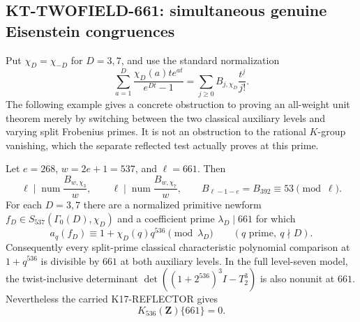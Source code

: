 \subsection{KT-TWOFIELD-661: simultaneous genuine Eisenstein congruences}
\label{sec:kt-twofield-661}

Put $\chi_D=\chi_{-D}$ for $D=3,7$, and use the standard
normalization
\[
 \sum_{a=1}^{D}\frac{\chi_D(a)t e^{at}}{e^{Dt}-1}
       =\sum_{j\geq0}B_{j,\chi_D}\frac{t^j}{j!}.
                                                               \tag{TF.1}
\]
The following example gives a concrete obstruction to proving
an all-weight unit theorem merely by switching between the
two classical auxiliary levels and varying split Frobenius
primes. It is not an obstruction to the rational $K$-group
vanishing, which the separate reflected test actually proves
at this prime.

\begin{proposition}[KT-TWOFIELD-661]
Let $e=268$, $w=2e+1=537$, and $\ell=661$. Then
\[
 \ell\mid\operatorname{num}\frac{B_{w,\chi_3}}w,
 \qquad
 \ell\mid\operatorname{num}\frac{B_{w,\chi_7}}w,
 \qquad
 B_{\ell-1-e}=B_{392}\equiv53\pmod\ell.
                                                               \tag{TF.2}
\]
For each $D=3,7$ there are a normalized primitive newform
$f_D\in S_{537}(\Gamma_0(D),\chi_D)$ and a coefficient
prime $\lambda_D\mid661$ for which
\[
 a_q(f_D)\equiv1+\chi_D(q)q^{536}\pmod{\lambda_D}
                  \qquad(q\text{ prime},\ q\nmid D).
                                                               \tag{TF.3}
\]
Consequently every split-prime classical characteristic
polynomial comparison at $1+q^{536}$ is divisible by $661$
at both auxiliary levels. In the full level-seven model,
the twist-inclusive determinant
$\det((1+2^{536})^3I-T_2^3)$ is also nonunit at $661$.
Nevertheless the carried K17-REFLECTOR gives
\[
                         K_{536}(\mathbf Z)\{661\}=0.
                                                               \tag{TF.4}
\]
\end{proposition}


